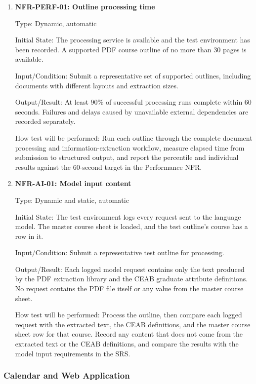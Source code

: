 \documentclass[12pt, titlepage]{article}
\begin{document}
\begin{enumerate}
\item{\label{NFR-PERF-01}\textbf{NFR-PERF-01: Outline processing time}\\}

Type: Dynamic, automatic

Initial State: The processing service is available and the test environment
has been recorded. A supported PDF course outline of no more than 30 pages is
available.
					
Input/Condition: Submit a representative set of supported outlines, including documents
with different layouts and extraction sizes.
					
Output/Result: At least 90\% of successful processing runs complete within 60
seconds. Failures and delays caused by unavailable external dependencies are
recorded separately.
					
How test will be performed: Run each outline through the complete document
processing and information-extraction workflow, measure elapsed time from
submission to structured output, and report the percentile and individual
results against the 60-second target in the Performance NFR.

\item{\label{NFR-AI-01}\textbf{NFR-AI-01: Model input content}\\}

Type: Dynamic and static, automatic

Initial State: The test environment logs every request sent to the language
model. The master course sheet is loaded, and the test outline's course has a
row in it.

Input/Condition: Submit a representative test outline for processing.

Output/Result: Each logged model request contains only the text produced by
the PDF extraction library and the CEAB graduate attribute definitions. No
request contains the PDF file itself or any value from the master course
sheet.

How test will be performed: Process the outline, then compare each logged
request with the extracted text, the CEAB definitions, and the master course
sheet row for that course. Record any content that does not come from the
extracted text or the CEAB definitions, and compare the results with the
model input requirements in the SRS.

\end{enumerate}

\subsubsection{Calendar and Web Application}
\end{document}
